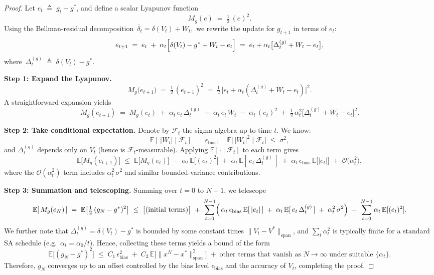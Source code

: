 \begin{proof}
Let $e_t \;\triangleq\; g_t - g^*$, and define a scalar Lyapunov function
\[
  M_g(e) \;=\; \tfrac12\,(e)^2.
\]
Using the Bellman-residual decomposition
\(\,\overline{\delta}_t = \delta(V_t) + W_t,\)
we rewrite the update for $g_{t+1}$ in terms of $e_t$:
\[
  e_{t+1}
  \;=\;
  e_t
  \;+\;
  \alpha_t \Bigl[\delta(V_t) - g^* + W_t - e_t\Bigr]
  \;=\;
  e_t + \alpha_t\bigl[\Delta_t^{(g)} + W_t - e_t\bigr],
\]
where
\(\,\Delta_t^{(g)} \;\triangleq\; \delta(V_t) - g^*.\)

\noindent
\textbf{Step 1: Expand the Lyapunov.}
\[
  M_g\bigl(e_{t+1}\bigr)
  \;=\;
  \tfrac12\,(e_{t+1})^2
  \;=\;
  \tfrac12\,
   \bigl[e_t + \alpha_t(\Delta_t^{(g)} + W_t - e_t)\bigr]^2.
\]
A straightforward expansion yields
\[
  M_g(e_{t+1})
  \;=\;
  M_g(e_t)
  \;+\;
  \alpha_t\,e_t\,\Delta_t^{(g)}
  \;+\;
  \alpha_t\,e_t\,W_t
  \;-\;
  \alpha_t\,(e_t)^2
  \;+\;
  \tfrac12\,\alpha_t^2
     \bigl[\Delta_t^{(g)} + W_t - e_t\bigr]^2.
\]

\noindent
\textbf{Step 2: Take conditional expectation.}
Denote by $\mathcal{F}_t$ the sigma-algebra up to time $t$. We know:
\[
  \mathbb{E}[\,|W_t|\mid \mathcal{F}_t] \;=\; \epsilon_{\mathrm{bias}},
  \quad
  \mathbb{E}\bigl[\,|W_t|^2 \mid \mathcal{F}_t\bigr]\;\le\;\sigma^2,
\]
and $\Delta_t^{(g)}$ depends only on $V_t$ (hence is $\mathcal{F}_t$-measurable).
Applying $\mathbb{E}[\cdot\mid \mathcal{F}_t]$ to each term gives
\[
  \mathbb{E}\bigl[M_g(e_{t+1})\bigr]
  \;\le\;
  \mathbb{E}\bigl[M_g(e_t)\bigr]
  \;-\;
  \alpha_t\,\mathbb{E}\bigl[(e_t)^2\bigr]
  \;+\;
  \alpha_t\,\mathbb{E}[\,e_t\,\Delta_t^{(g)}\,]
  \;+\;
  \alpha_t\,\epsilon_{\mathrm{bias}}
      \,\mathbb{E}\bigl[|e_t|\bigr]
  \;+\;
  \mathcal{O}\bigl(\alpha_t^2\bigr),
\]
where the $\mathcal{O}(\alpha_t^2)$ term includes
$\alpha_t^2\,\sigma^2$ and similar bounded-variance contributions.

\noindent
\textbf{Step 3: Summation and telescoping.}
Summing over $t=0$ to $N-1$, we telescope
\[
  \mathbb{E}[\,M_g(e_N)\,]
  \;=\;
  \mathbb{E}\bigl[\tfrac12\,(g_N-g^*)^2\bigr]
  \;\le\;
  \bigl[\text{(initial terms)}\bigr]
  \;+\;
  \sum_{t=0}^{N-1}
   \Bigl(\,\alpha_t\,\epsilon_{\mathrm{bias}}\,\mathbb{E}[\,|e_t|\,]
     \;+\;
     \alpha_t\,\mathbb{E}[\,e_t\,\Delta_t^{(g)}\,]
     \;+\;
     \alpha_t^2\,\sigma^2
   \Bigr)
   \;-\;
   \sum_{t=0}^{N-1}
   \alpha_t\,\mathbb{E}[(e_t)^2].
\]
We further note that $\Delta_t^{(g)} = \delta(V_t)-g^*$ is bounded by
some constant times $\|V_t - V^*\|_{\mathrm{span}}$, and
$\sum_{t}\alpha_t^2$ is typically finite for a standard SA schedule
(e.g.\ $\alpha_t=\alpha_0/t$).
Hence, collecting these terms yields a bound of the form
\[
  \mathbb{E}\bigl[(g_N - g^*)^2\bigr]
  \;\le\;
  C_1\,\epsilon_{\mathrm{bias}}^2
  \;+\;
  C_2\,\mathbb{E}\bigl[\|x^N - x^*\|_{\mathrm{span}}^2\bigr]
  \;+\;
  \text{other terms that vanish as }N\to\infty
  \text{ under suitable }\{\alpha_t\}.
\]
Therefore, $g_N$ converges up to an offset controlled by the bias level
$\epsilon_{\mathrm{bias}}$ and the accuracy of $V_t$, completing the proof.
\end{proof}
